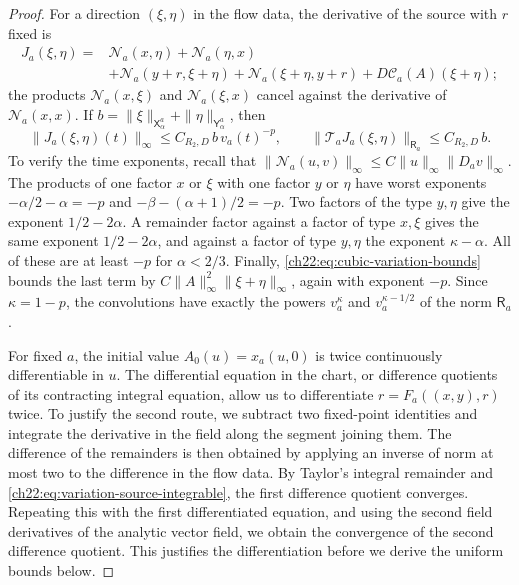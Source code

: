 \begin{proof}
For a direction $(\xi,\eta)$ in the flow data, the derivative of the source with $r$ fixed is
\begin{equation}\label{ch22:eq:variation-input-source}
 \begin{split}
 J_a(\xi,\eta)={}&\mathcal N_a(x,\eta)+\mathcal N_a(\eta,x)\\
 &+\mathcal N_a(y+r,\xi+\eta)+\mathcal N_a(\xi+\eta,y+r)+D\mathscr C_a(A)(\xi+\eta);
 \end{split}
\end{equation}
the products $\mathcal N_a(x,\xi)$ and $\mathcal N_a(\xi,x)$ cancel against the derivative of $\mathcal N_a(x,x)$. If $b=\|\xi\|_{\mathsf X_\alpha^a}+\|\eta\|_{\mathsf Y_\alpha^a}$, then
\begin{equation}\label{ch22:eq:variation-source-integrable}
 \|J_a(\xi,\eta)(t)\|_\infty\le C_{R_2,D}\,b\,v_a(t)^{-p},\qquad
 \|\mathcal T_aJ_a(\xi,\eta)\|_{\mathsf R_a}\le C_{R_2,D}\,b .
\end{equation}
To verify the time exponents, recall that $\|\mathcal N_a(u,v)\|_\infty\le C\|u\|_\infty\|D_av\|_\infty$. The products of one factor $x$ or $\xi$ with one factor $y$ or $\eta$ have worst exponents $-\alpha/2-\alpha=-p$ and $-\beta-(\alpha+1)/2=-p$. Two factors of the type $y,\eta$ give the exponent $1/2-2\alpha$. A remainder factor against a factor of type $x,\xi$ gives the same exponent $1/2-2\alpha$, and against a factor of type $y,\eta$ the exponent $\kappa-\alpha$. All of these are at least $-p$ for $\alpha<2/3$. Finally, \eqref{ch22:eq:cubic-variation-bounds} bounds the last term by $C\|A\|_\infty^2\|\xi+\eta\|_\infty$, again with exponent $-p$. Since $\kappa=1-p$, the convolutions have exactly the powers $v_a^{\kappa}$ and $v_a^{\kappa-1/2}$ of the norm $\mathsf R_a$.

For fixed $a$, the initial value $A_0(u)=x_a(u,0)$ is twice continuously differentiable in $u$. The differential equation in the chart, or difference quotients of its contracting integral equation, allow us to differentiate $r=F_a((x,y),r)$ twice. To justify the second route, we subtract two fixed-point identities and integrate the derivative in the field along the segment joining them. The difference of the remainders is then obtained by applying an inverse of norm at most two to the difference in the flow data. By Taylor's integral remainder and \eqref{ch22:eq:variation-source-integrable}, the first difference quotient converges. Repeating this with the first differentiated equation, and using the second field derivatives of the analytic vector field, we obtain the convergence of the second difference quotient. This justifies the differentiation before we derive the uniform bounds below.


\end{proof}
